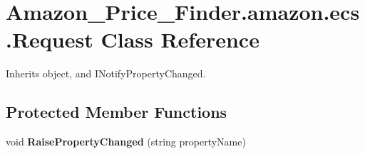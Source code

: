 \hypertarget{class_amazon___price___finder_1_1amazon_1_1ecs_1_1_request}{\section{Amazon\-\_\-\-Price\-\_\-\-Finder.\-amazon.\-ecs.\-Request Class Reference}
\label{class_amazon___price___finder_1_1amazon_1_1ecs_1_1_request}
}


 




Inherits object, and I\-Notify\-Property\-Changed.

\subsection*{Protected Member Functions}
\begin{DoxyCompactItemize}
\item 
\hypertarget{class_amazon___price___finder_1_1amazon_1_1ecs_1_1_request_a41fade0d404dbe0aa72178b2b6d1dd55}{void {\bfseries Raise\-Property\-Changed} (string property\-Name)}\label{class_amazon___price___finder_1_1amazon_1_1ecs_1_1_request_a41fade0d404dbe0aa72178b2b6d1dd55}

\end{DoxyCompactItemize}
